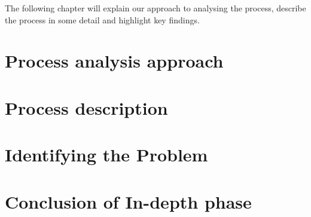 The following chapter will explain our approach to analysing the process, describe the process in some detail and highlight key findings.

\section{Process analysis approach}

\section{Process description}

\section{Identifying the Problem} 

\section{Conclusion of In-depth phase}
